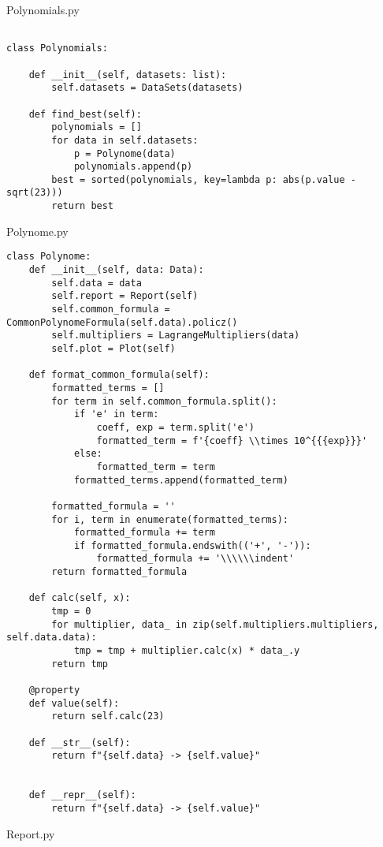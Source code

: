 \documentclass[12pt]{article}
\begin{document}
Polynomials.py
\begin{lstlisting}[frame=single]

class Polynomials:

    def __init__(self, datasets: list):
        self.datasets = DataSets(datasets)

    def find_best(self):
        polynomials = []
        for data in self.datasets:
            p = Polynome(data)
            polynomials.append(p)
        best = sorted(polynomials, key=lambda p: abs(p.value - sqrt(23)))
        return best

\end{lstlisting}
Polynome.py
\begin{lstlisting}[frame=single]
class Polynome:
    def __init__(self, data: Data):
        self.data = data
        self.report = Report(self)
        self.common_formula = CommonPolynomeFormula(self.data).policz()
        self.multipliers = LagrangeMultipliers(data)
        self.plot = Plot(self)

    def format_common_formula(self):
        formatted_terms = []
        for term in self.common_formula.split():
            if 'e' in term:
                coeff, exp = term.split('e')
                formatted_term = f'{coeff} \\times 10^{{{exp}}}'
            else:
                formatted_term = term
            formatted_terms.append(formatted_term)

        formatted_formula = ''
        for i, term in enumerate(formatted_terms):
            formatted_formula += term
            if formatted_formula.endswith(('+', '-')):
                formatted_formula += '\\\\\\indent'
        return formatted_formula

    def calc(self, x):
        tmp = 0
        for multiplier, data_ in zip(self.multipliers.multipliers, self.data.data):
            tmp = tmp + multiplier.calc(x) * data_.y
        return tmp

    @property
    def value(self):
        return self.calc(23)

    def __str__(self):
        return f"{self.data} -> {self.value}"


    def __repr__(self):
        return f"{self.data} -> {self.value}"
\end{lstlisting}
Report.py
\end{document}
